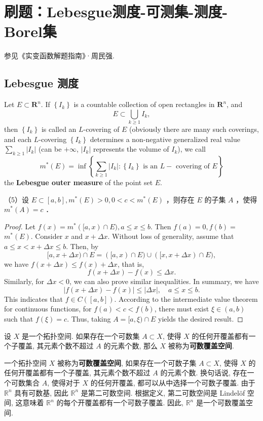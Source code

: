 \section{刷题：Lebesgue测度-可测集-测度-Borel集}

参见《实变函数解题指南》·周民强.

\subsection{Lebesgue 测度}

\begin{definition}
Let $E \subset \mathbf{R}^n$. If $\left\{I_k\right\}$ is a countable collection of open rectangles in $\mathbf{R}^n$, and
\[
E \subset \bigcup_{k \geqslant 1} I_k,
\]then $\left\{I_k\right\}$ is called an $L$-covering of $E$ (obviously there are many such coverings, and each $L$-covering $\left\{I_k\right\}$ determines a non-negative generalized real value $\sum_{k \geqslant 1}\left|I_k\right|$ (can be $+\infty$, $\left|I_k\right|$ represents the volume of $I_k$), we call
\[
m^*(E)=\inf \left\{\sum_{k \geqslant 1}\left|I_k\right|:\left\{I_k\right\} \text { is an } L-\text { covering of } E\right\}
\]the \textbf{Lebesgue outer measure} of the point set $E$.
\end{definition}
\begin{exercise}
（5）设 $E \subset[a, b], m^*(E)>0,0<c<m^*(E)$ ，则存在 $E$ 的子集 $A$ ，使得 $m^*(A)=c$ ．
\end{exercise}
\begin{proof}
Let $f(x)=m^*([a, x) \cap E), a \leq x \leq b$. Then $f(a)=0, f(b)=$ $m^*(E)$. Consider $x$ and $x+\Delta x$. Without loss of generality, assume that $a \leq x<x+\Delta x \leq b$. Then, by
\[
[a, x+\Delta x) \cap E=([a, x) \cap E) \cup([x, x+\Delta x) \cap E),
\]
we have $f(x+\Delta x) \leq f(x)+\Delta x$, that is,
\[
f(x+\Delta x)-f(x) \leq \Delta x .
\]
Similarly, for $\Delta x<0$, we can also prove similar inequalities. In summary, we have
\[
|f(x+\Delta x)-f(x)| \leq|\Delta x|, \quad a \leq x \leq b .
\]
This indicates that $f \in C([a, b])$. According to the intermediate value theorem for continuous functions, for $f(a)<c<f(b)$, there must exist $\xi \in(a, b)$ such that $f(\xi)=c$. Thus, taking $A=[a, \xi) \cap E$ yields the desired result.
\end{proof}

\begin{definition}[可数覆盖空间]
设 $X$ 是一个拓扑空间. 如果存在一个可数集 $A \subset X$, 使得 $X$ 的任何开覆盖都有一个子覆盖, 其元素个数不超过 $A$ 的元素个数, 那么 $X$ 被称为\textbf{可数覆盖空间}.
\end{definition}
一个拓扑空间 $X$ 被称为\textbf{可数覆盖空间}, 如果存在一个可数子集 $A \subset X$, 使得 $X$ 的任何开覆盖都有一个子覆盖, 其元素个数不超过 $A$ 的元素个数. 换句话说, 存在一个可数集合 $A$, 使得对于 $X$ 的任何开覆盖, 都可以从中选择一个可数子覆盖.
由于 $\mathbb{R}^n$ 具有可数基, 因此 $\mathbb{R}^n$ 是第二可数空间. 根据定义, 第二可数空间是 Lindelöf 空间, 这意味着 $\mathbb{R}^n$ 的每个开覆盖都有一个可数子覆盖. 因此, $\mathbb{R}^n$ 是一个可数覆盖空间.

